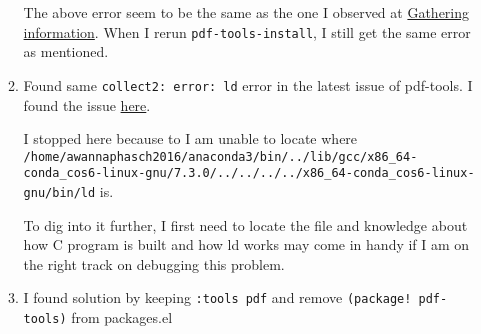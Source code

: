 \documentclass[11pt]{article}
\begin{document}
\begin{enumerate}
\begin{enumerate}
The above error seem to be the same as the one I observed at \hyperref[sec:orga657536]{Gathering information}.
When I rerun \texttt{pdf-tools-install}, I still get the same error as mentioned.
\item Found same \texttt{collect2: error: ld} error in the latest issue of pdf-tools.
\label{sec:org5d0d048}
I found the issue \href{https://github.com/vedang/pdf-tools/issues/42}{here}.

I stopped here because to I am unable to locate where \texttt{/home/awannaphasch2016/anaconda3/bin/../lib/gcc/x86\_64-conda\_cos6-linux-gnu/7.3.0/../../../../x86\_64-conda\_cos6-linux-gnu/bin/ld} is.

To dig into it further, I first need to locate the file and knowledge about how C program is built and how ld works may come in handy if I am on the right track on debugging this problem.
\item I found solution by keeping \texttt{:tools pdf} and remove \texttt{(package! pdf-tools)} from packages.el
\label{sec:orgb8acb4d}
\end{enumerate}
\end{enumerate}
\end{document}
